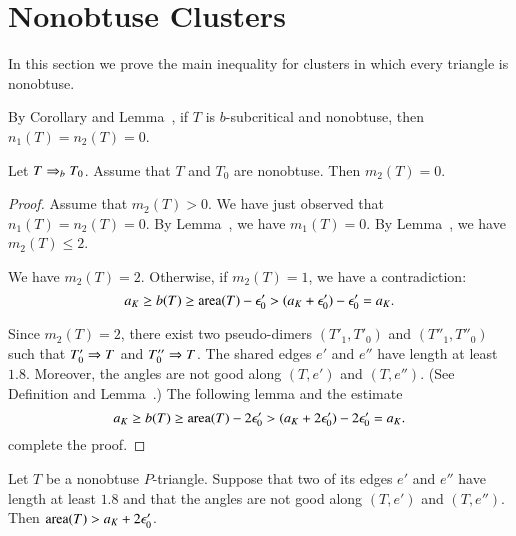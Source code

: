 \section{Nonobtuse Clusters}

In this section we prove the main inequality for clusters in which every
triangle is nonobtuse.

By Corollary  and Lemma~, 
if $T$ is $b$-subcritical and nonobtuse, then $n_1(T)=n_2(T)=0$.


\begin{lemma} Let $T\Rightarrow_{b} T_0$. Assume that $T$ and $T_0$ are nonobtuse.
Then $m_2(T)=0$.
\end{lemma}

\begin{proof}  Assume that $m_2(T)>0$.  We have just observed that $n_1(T)=n_2(T)=0$.
By Lemma~, we have $m_1(T)=0$.
By Lemma~, we have $m_2(T)\le 2$. 


We have $m_2(T)=2$.  Otherwise, if $m_2(T)=1$, we have a contradiction:
\[
a_K \ge b(T) \ge {\operatorname{area}}(T) - \epsilon_0' > (a_K + \epsilon_0') - \epsilon_0' = a_K.
\]

Since $m_2(T)=2$, there exist two pseudo-dimers $(T'_1,T'_0)$ and $(T''_1,T''_0)$ such that
$T'_0\Rightarrow T$ and $T''_0\Rightarrow T$.  The shared edges $e'$ and $e''$ have length at least $1.8$.
Moreover, the angles are not good along $(T,e')$ and $(T,e'')$.  (See Definition  and Lemma~.)
The following lemma and the estimate 
\[
a_K \ge b(T) \ge {\operatorname{area}}(T) - 2\epsilon_0' > (a_K + 2\epsilon_0') - 2\epsilon_0' = a_K.
\]
complete the proof.
\end{proof}

\begin{lemma} Let $T$ be a nonobtuse $P$-triangle.  Suppose that two of its edges $e'$ and $e''$ have length at least $1.8$
and that the angles are not good along $(T,e')$ and $(T,e'')$.  Then ${\operatorname{area}}(T) > a_K + 2\epsilon_0'$.
\end{lemma}

